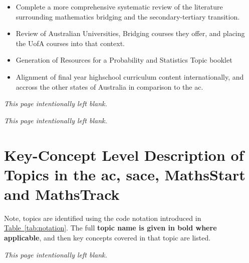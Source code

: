 \documentclass[twoside,12pt,a4paper]{report}
\makeatletter
\newcommand*{\intentionallyblankpage}{
  \vspace*{\fill}
  {\centering \textit{This page intentionally left blank.} \par}
  \vspace{\fill}}
\renewcommand*{\cleardoublepage}{\clearpage\if@twoside \ifodd\c@page\else
  \intentionallyblankpage
  \newpage
  \if@twocolumn\hbox{}\newpage\fi\fi\fi}
\newcommand{\reftab}[1]{\hyperref[tab:#1]{Table~\ref{tab:#1}}}
\makeatother
\begin{document}
\begin{itemize}
	\item Complete a more comprehensive systematic review of the literature surrounding mathematics bridging and the secondary-tertiary transition.
	\item Review of Australian Universities, Bridging courses they offer, and placing the UofA courses into that context.
	\item Generation of Resources for a Probability and Statistics Topic booklet
	\item Alignment of final year highschool curriculum content internationally, and accross the other states of Australia in comparison to the \gls{ac}.
\end{itemize}


\cleardoublepage
\begin{appendices}

\cleardoublepage
\chapter{Key-Concept Level Description of Topics in the \gls{ac}, \gls{sace}, MathsStart and MathsTrack}
\label{app:concepts}

Note, topics are identified using the code notation introduced in \reftab{notation}. The full \textbf{topic name is given in bold where applicable}, and then key concepts covered in that topic are listed.



\end{appendices}

\glsresetall
\cleardoublepage

 
\end{document}
